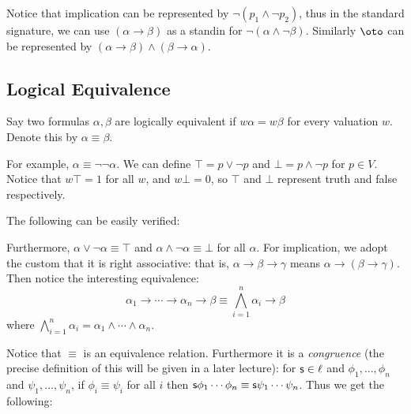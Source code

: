 Notice that implication can be represented by $\neg(p_1\land\neg p_2)$, thus in the standard
signature, we can use $(\alpha\to\beta)$ as a standin for $\neg(\alpha\land\neg\beta)$.
Similarly $\oto$ can be represented by $(\alpha\to\beta)\land(\beta\to\alpha)$.

\subsection{Logical Equivalence}

\bdefn

    Say two formulas $\alpha,\beta$ are {\emphcolor logically equivalent} if $w\alpha=w\beta$
    for every valuation $w$.
    Denote this by $\alpha\equiv\beta$.

\edefn

For example, $\alpha\equiv\neg\neg\alpha$.
We can define $\top=p\lor\neg p$ and $\bot=p\land\neg p$ for $p\in V$.
Notice that $w\top=1$ for all $w$, and $w\bot=0$, so $\top$ and $\bot$ represent truth and false
respectively.

The following can be easily verified:

\centerline{\vbox{\tabskip=1cm
\halign{&$#$\hfil\cr
    \alpha\land(\beta\land\gamma)\equiv(\alpha\land\beta)\land\gamma &
    \alpha\lor(\beta\lor\gamma)\equiv(\alpha\lor\beta)\lor\gamma \cr
    \alpha\land\beta\equiv\beta\land\alpha &
    \alpha\lor\beta\equiv\beta\lor\alpha\cr
    \alpha\land\alpha\equiv\alpha &
    \alpha\lor\alpha\equiv\alpha \cr
    \alpha\land(\beta\lor\gamma)\equiv(\alpha\land\beta)\lor(\alpha\land\gamma) &
    \alpha\lor(\beta\land\gamma)\equiv(\alpha\lor\beta)\land(\alpha\lor\gamma)\cr
    \neg(\alpha\land\beta)\equiv\neg\alpha\lor\neg\beta &
    \neg(\alpha\lor\beta)\equiv\neg\alpha\land\neg\beta\cr
}}}

Furthermore, $\alpha\lor\neg\alpha\equiv\top$ and $\alpha\land\neg\alpha\equiv\bot$ for all
$\alpha$.
For implication, we adopt the custom that it is right associative: that is,
$\alpha\to\beta\to\gamma$ means $\alpha\to(\beta\to\gamma)$.
Then notice the interesting equivalence:
$$ \alpha_1\to\cdots\to\alpha_n\to\beta \equiv \bigwedge_{i=1}^n\alpha_i\to\beta $$
where $\bigwedge_{i=1}^n\alpha_i=\alpha_1\wedge\cdots\wedge\alpha_n$.

Notice that $\equiv$ is an equivalence relation.
Furthermore it is a {\it congruence} (the precise definition of this will be given in a later
lecture): for ${\sf s}\in\ell$ and $\phi_1,\dots,\phi_n$ and $\psi_1,\dots,\psi_n$, if
$\phi_i\equiv\psi_i$ for all $i$ then ${\sf s}\phi_1\cdots\phi_n\equiv{\sf s}\psi_1\cdots\psi_n$.
Thus we get the following:


